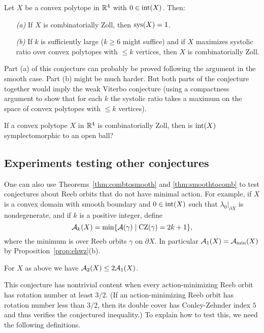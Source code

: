 \begin{conjecture}
Let $X$ be a convex polytope in ${\mathbb R}^4$ with $0\in\operatorname{int}(X)$. Then:
\begin{itemize}
\item[\emph{(a)}] If $X$ is combinatorially Zoll, then $\operatorname{sys}(X)=1$.
\item[\emph{(b)}] If $k$ is sufficiently large ($k\ge 6$ might suffice) and if $X$ maximizes systolic ratio over convex polytopes with $\le k$ vertices, then $X$ is combinatorially Zoll.
\end{itemize}
\end{conjecture}

Part (a) of this conjecture can probably be proved following the argument in the smooth case. Part (b) might be much harder. But both parts of the conjecture together would imply the weak Viterbo conjecture (using a compactness argument to show that for each $k$ the systolic ratio takes a maximum on the space of convex polytopes with $\le k$ vertices).

\begin{question}
\label{question:zoll_ball}
If a convex polytope $X$ in ${\mathbb R}^4$ is combinatorially Zoll, then is $\operatorname{int}(X)$ symplectomorphic to an open ball?
\end{question}

\subsection{Experiments testing other conjectures}
\label{sec:otherexp}

One can also use Theorems~\ref{thm:combtosmooth} and \ref{thm:smoothtocomb} to test conjectures about Reeb orbits that do not have minimal action. For example, if $X$ is a convex domain with smooth boundary and $0\in\operatorname{int}(X)$ such that ${\lambda_0}|_{\partial X}$ is nondegenerate, and if $k$ is a positive integer, define
\begin{equation}
\label{eqn:defak}
{\mathcal A}_k(X) = \operatorname{min}\{{\mathcal A}(\gamma)\mid\operatorname{CZ}(\gamma) = 2k+1\},
\end{equation}
where the minimum is over Reeb orbits $\gamma$ on $\partial X$. In particular ${\mathcal A}_1(X) = {\mathcal A}_{\operatorname{min}}(X)$ by Proposition~\ref{prop:ehwz}(b).

\begin{conjecture}
\label{conj:A2}
For $X$ as above we have ${\mathcal A}_2(X) \le 2{\mathcal A}_1(X)$.
\end{conjecture}

This conjecture has nontrivial content when every action-minimizing Reeb orbit has rotation number at least $3/2$. (If an action-minimizing Reeb orbit has rotation number less than $3/2$, then its double cover has Conley-Zehnder index $5$ and thus verifies the conjectured inequality.) To explain how to test this, we need the following definitions.

